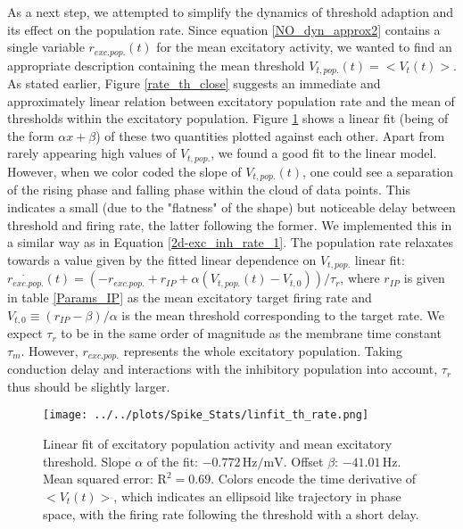 \documentclass[10pt,a4paper]{article}
\begin{document}
As a next step, we attempted to simplify the dynamics of threshold adaption and its effect on the population rate. Since equation \eqref{NO_dyn_approx2} contains a single variable $r_{exc.pop.}(t)$ for the mean excitatory activity, we wanted to find an appropriate description containing the mean threshold $V_{t,pop.}(t) = <V_t(t)>$. As stated earlier, Figure \ref{rate_th_close} suggests an immediate and approximately linear relation between excitatory population rate and the mean of thresholds within the excitatory population. Figure \ref{thresh_r_linfit} shows a linear fit (being of the form $\alpha x + \beta$) of these two quantities plotted against each other. Apart from rarely appearing high values of $V_{t,pop.}$, we found a good fit to the linear model. However, when we color coded the slope of $V_{t,pop.}(t)$, one could see a separation of the rising phase and falling phase within the cloud of data points. This indicates a small (due to the "flatness" of the shape) but noticeable delay between threshold and firing rate, the latter following the former. We implemented this in a similar way as in Equation \eqref{2d-exc_inh_rate_1}. The population rate relaxates towards a value given by the fitted linear dependence on $V_{t,pop.}$ linear fit: $\dot{r_{exc.pop.}}(t) = (-r_{exc.pop.} + r_{IP} + \alpha(V_{t,pop.}(t)-V_{t,0}))/\tau_r$, where $r_{IP}$ is given in table \ref{Params_IP} as the mean excitatory target firing rate and $V_{t,0} \equiv (r_{IP}-\beta)/\alpha$ is the mean threshold corresponding to the target rate. We expect $\tau_r$ to be in the same order of magnitude as the membrane time constant $\tau_m$. However, $r_{exc.pop.}$ represents the whole excitatory population. Taking conduction delay and interactions with the inhibitory population into account, $\tau_r$ thus should be slightly larger.

\begin{figure}
\texttt{[image: ../../plots/Spike\_Stats/linfit\_th\_rate.png]}
\caption{Linear fit of excitatory population activity and mean excitatory threshold. Slope $\alpha$ of the fit: $\mathrm{-0.772\, Hz/mV}$. Offset $\beta$: $\mathrm{-41.01\, Hz}$. Mean squared error: $\mathrm{R^2 = 0.69}$. Colors encode the time derivative of $<V_t(t)>$, which indicates an ellipsoid like trajectory in phase space, with the firing rate following the threshold with a short delay.}
\label{thresh_r_linfit}
\end{figure}
\end{document}
